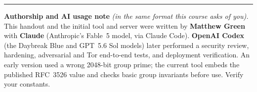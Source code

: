 \documentclass[11pt]{article}
\begin{document}
\bigskip
\noindent\rule{\textwidth}{0.4pt}

\medskip\noindent\textbf{Authorship and AI usage note} \emph{(in the same format this course asks of you).} This handout and the initial tool and server were written by \textbf{Matthew Green} with \textbf{Claude} (Anthropic's Fable~5 model, via Claude Code). \textbf{OpenAI Codex} (the Daybreak Blue and GPT~5.6 Sol models) later performed a security review, hardening, adversarial and Tor end-to-end tests, and deployment verification. An early version used a wrong 2048-bit group prime; the current tool embeds the published RFC~3526 value and checks basic group invariants before use. Verify your constants.
\end{document}

